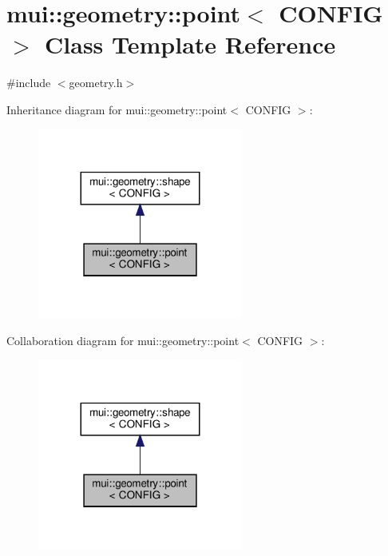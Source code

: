 \hypertarget{classmui_1_1geometry_1_1point}{}\section{mui\+:\+:geometry\+:\+:point$<$ C\+O\+N\+F\+IG $>$ Class Template Reference}
\label{classmui_1_1geometry_1_1point}


{\ttfamily \#include $<$geometry.\+h$>$}



Inheritance diagram for mui\+:\+:geometry\+:\+:point$<$ C\+O\+N\+F\+IG $>$\+:
\nopagebreak
\begin{figure}[H]
\begin{center}
\leavevmode
\includegraphics[width=191pt]{classmui_1_1geometry_1_1point__inherit__graph}
\end{center}
\end{figure}


Collaboration diagram for mui\+:\+:geometry\+:\+:point$<$ C\+O\+N\+F\+IG $>$\+:
\nopagebreak
\begin{figure}[H]
\begin{center}
\leavevmode
\includegraphics[width=191pt]{classmui_1_1geometry_1_1point__coll__graph}
\end{center}
\end{figure}

